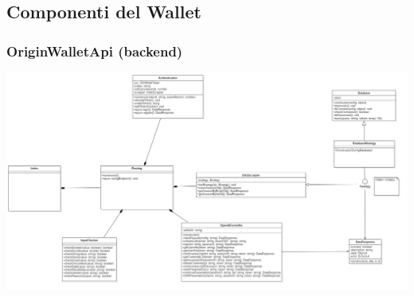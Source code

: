 \subsection{Componenti del \textbf{Wallet}}

\subsubsection{OriginWalletApi (backend)}
\includegraphics[scale=0.25]{./res/img/backendwallet.png}
